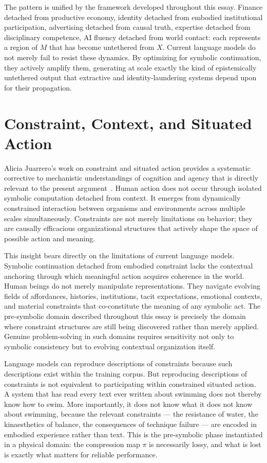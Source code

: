 \documentclass[12pt, a4paper]{article}
\theoremstyle{remark}
\begin{document}
The pattern is unified by the framework developed throughout this essay. Finance detached from productive economy, identity detached from embodied institutional participation, advertising detached from causal truth, expertise detached from disciplinary competence, AI fluency detached from world contact: each represents a region of $M$ that has become untethered from $X$. Current language models do not merely fail to resist these dynamics. By optimizing for symbolic continuation, they actively amplify them, generating at scale exactly the kind of epistemically untethered output that extractive and identity-laundering systems depend upon for their propagation.

\section{Constraint, Context, and Situated Action}

Alicia Juarrero's work on constraint and situated action provides a systematic corrective to mechanistic understandings of cognition and agency that is directly relevant to the present argument~\cite{Juarrero1999}. Human action does not occur through isolated symbolic computation detached from context. It emerges from dynamically constrained interaction between organisms and environments across multiple scales simultaneously. Constraints are not merely limitations on behavior; they are causally efficacious organizational structures that actively shape the space of possible action and meaning.

This insight bears directly on the limitations of current language models. Symbolic continuation detached from embodied constraint lacks the contextual anchoring through which meaningful action acquires coherence in the world. Human beings do not merely manipulate representations. They navigate evolving fields of affordances, histories, institutions, tacit expectations, emotional contexts, and material constraints that co-constitute the meaning of any symbolic act. The pre-symbolic domain described throughout this essay is precisely the domain where constraint structures are still being discovered rather than merely applied. Genuine problem-solving in such domains requires sensitivity not only to symbolic consistency but to evolving contextual organization itself.

Language models can reproduce descriptions of constraints because such descriptions exist within the training corpus. But reproducing descriptions of constraints is not equivalent to participating within constrained situated action. A system that has read every text ever written about swimming does not thereby know how to swim. More importantly, it does not know what it does not know about swimming, because the relevant constraints --- the resistance of water, the kinaesthetics of balance, the consequences of technique failure --- are encoded in embodied experience rather than text. This is the pre-symbolic phase instantiated in a physical domain: the compression map $\pi$ is necessarily lossy, and what is lost is exactly what matters for reliable performance.
\end{document}
